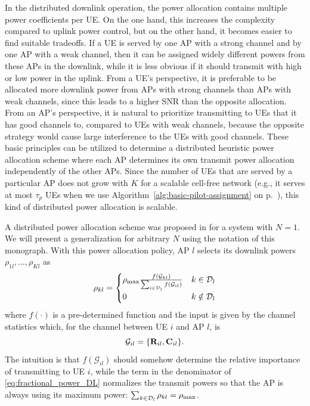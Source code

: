 In the distributed downlink operation, the power allocation contains multiple power coefficients per UE. On the one hand, this increases the complexity compared to uplink power control, but on the other hand, it becomes easier to find suitable tradeoffs. If a UE is served by one AP with a strong channel and by one AP with a weak channel, then it can be assigned widely different powers from these APs in the downlink, while it is less obvious if it should transmit with high or low power in the uplink.
From a UE's perspective, it is preferable to be allocated more downlink power from APs with strong channels than APs with weak channels, since this leads to a higher SNR than the opposite allocation.
From an AP's perspective, it is natural to prioritize transmitting to UEs that it has good channels to, compared to UEs with weak channels, because the opposite strategy would cause large interference to the UEs with good channels. 
These basic principles can be utilized to determine a distributed heuristic power allocation scheme where each AP determines its own transmit power allocation independently of the other APs.
Since the number of UEs that are served by a particular AP does not grow with $K$ for a scalable cell-free network (e.g., it serves at most $\tau_p$ UEs when we use Algorithm~\ref{alg:basic-pilot-assignment} on p.~\pageref{alg:basic-pilot-assignment}), this kind of distributed power allocation is scalable. 

A distributed power allocation scheme was proposed in  \cite{Interdonato2019a} for a system with $N=1$. We will present a generalization for arbitrary $N$ using the notation of this monograph. With this power allocation policy, AP $l$ selects its downlink powers $\rho_{1l}, \ldots, \rho_{Kl}$ as
\begin{equation} \label{eq:fractional_power_DL}
\rho_{kl} = \begin{cases} \rho_{\textrm{max}} \frac{f\left(\mathcal{G}_{kl}\right)}{\sum_{i \in \mathcal{D}_l} f\left(\mathcal{G}_{il}\right)} &  k \in \mathcal{D}_l\\
0 &  k \notin \mathcal{D}_l
\end{cases}
\end{equation}
where $f(\cdot)$ is a pre-determined function and the input is given by the channel statistics which, for the channel between UE $i$ and AP $l$, is
\begin{equation}
\mathcal{G}_{il} = \{ \mathbf{R}_{il}, \mathbf{C}_{il} \}.
\end{equation}
The intuition is that $f\left(\mathcal{G}_{il}\right)$ should somehow determine the relative importance of transmitting to UE $i$, while the term in the denominator of \eqref{eq:fractional_power_DL} normalizes the transmit powers so that the AP is always using its maximum power: $\sum_{k \in \mathcal{D}_l} \rho_{kl} = \rho_{\textrm{max}}$. 


